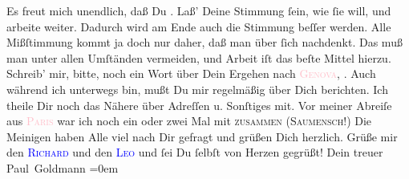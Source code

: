            \pstart
           Es freut mich unendlich, daß Du \label{K_L02849-3v}\label{K_L02849-3h}. Laß’ Deine Stimmung ſein, wie ſie will, und arbeite weiter. Dadurch wird am
               Ende auch die Stimmung beſſer werden. Alle Mißſtimmung kommt ja doch nur daher, daß
                  {\pb}man \strikeout{\textcolor{gray}{×}} über ſich nachdenkt. Das muß man unter allen Umſtänden vermeiden, und Arbeit
               iſt das beſte Mittel hierzu.\pend
           \pstart
           Schreib’ mir, bitte, noch ein Wort über Dein Ergehen nach \textsc{\textcolor{pink}{Genova}{}\ledrightnote{\textcolor{pink}{Genua}}}, \label{K_L02849-4v}\label{K_L02849-4h}. Auch
               während ich unterwegs bin, mußt Du mir regelmäßig über Dich berichten. Ich theile Dir
               noch das Nähere über Adreſſen u. Sonſtiges mit. \pend
           \pstart
           {\pb}Vor meiner Abreiſe aus \textsc{\textcolor{pink}{Paris}{}\ledrightnote{\textcolor{pink}{Paris}}} war ich noch ein oder zwei Mal mit \textsc{\label{K_L02849-11v} zuſammen (Saumenſch}{}\label{K_L02849-11h}!) \pend
           \pstart
           Die Meinigen haben Alle viel nach Dir gefragt und grüßen Dich herzlich.\pend
           \pstart
           Grüße mir den \textsc{\textcolor{blue}{Richard}{}\ledrightnote{\textcolor{blue}{Richard Beer-Hofmann}}} und den \textsc{\textcolor{blue}{Leo}{}\ledrightnote{\textcolor{blue}{Leo Van-Jung}}} und ſei Du ſelbſt von Herzen gegrüßt!\pend
           \pstart
           Dein treuer {\\[\baselineskip]}\spacefill\mbox{Paul Goldmann}\pend
           \leftskip=0em{}\endnumbering{}\begin{anhang}\end{anhang}
      